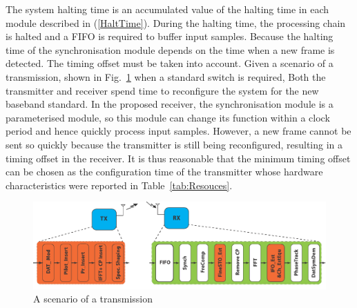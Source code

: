 The system halting time is an accumulated value of the halting time in each module described in (\ref{HaltTime}). During the halting time, the processing chain is halted and a FIFO is required to buffer input samples. Because the halting time of the synchronisation module depends on the time when a new frame is detected. The timing offset must be taken into account. Given a scenario of a transmission, shown in Fig.~\ref{fig:tx-rx} when a standard switch is required, Both the transmitter and receiver spend time to reconfigure the system for the new baseband standard. In the proposed receiver, the synchronisation module is a parameterised module, so this module can change its function within a clock period and hence quickly process input samples. However, a new frame cannot be sent so quickly because the transmitter is still being reconfigured, resulting in a timing offset in the receiver. It is thus reasonable that the minimum timing offset can be chosen as the configuration time of the transmitter whose hardware characteristics were reported in Table~\ref{tab:Resouces}.
\begin{figure}
\centering
\includegraphics [width=1\columnwidth]{Figures/CR_Tx-Rx.pdf}
\caption{A scenario of a transmission}
\label{fig:tx-rx}
\end{figure}

